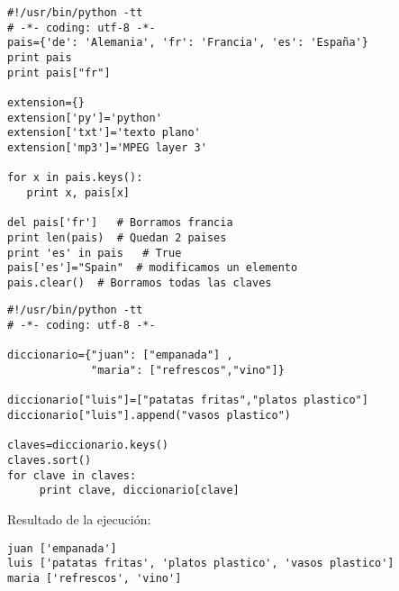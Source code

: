 \documentclass[ucs]{beamer}
\begin{document}

\begin{frame}[fragile]
  \begin{scriptsize}
\begin{verbatim}
#!/usr/bin/python -tt
# -*- coding: utf-8 -*-
pais={'de': 'Alemania', 'fr': 'Francia', 'es': 'España'}
print pais
print pais["fr"]

extension={}
extension['py']='python'
extension['txt']='texto plano'
extension['mp3']='MPEG layer 3'

for x in pais.keys():
   print x, pais[x]

del pais['fr']   # Borramos francia
print len(pais)  # Quedan 2 paises
print 'es' in pais   # True
pais['es']="Spain"  # modificamos un elemento
pais.clear()  # Borramos todas las claves
\end{verbatim}
  \end{scriptsize}

\end{frame}


\begin{frame}[fragile]


  \begin{footnotesize}
  \begin{verbatim}
#!/usr/bin/python -tt
# -*- coding: utf-8 -*-

diccionario={"juan": ["empanada"] ,
             "maria": ["refrescos","vino"]}

diccionario["luis"]=["patatas fritas","platos plastico"]
diccionario["luis"].append("vasos plastico")

claves=diccionario.keys()
claves.sort()
for clave in claves:
     print clave, diccionario[clave]
  \end{verbatim}
  \end{footnotesize}

Resultado de la ejecución:
  \begin{footnotesize}
  \begin{verbatim}
juan ['empanada']
luis ['patatas fritas', 'platos plastico', 'vasos plastico']
maria ['refrescos', 'vino']
  \end{verbatim}
  \end{footnotesize}


\end{frame}
\end{document}
